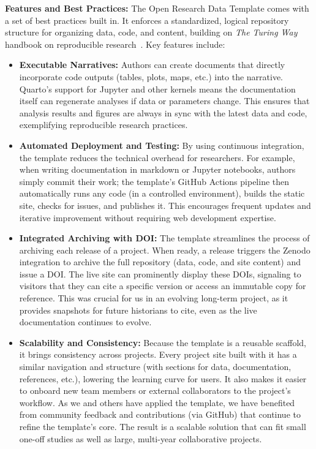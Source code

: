 \documentclass{anthology-ch}         %
\begin{document}
\textbf{Features and Best Practices:} The Open Research Data Template comes with a set of best practices built in. It enforces a standardized, logical repository structure for organizing data, code, and content, building on \emph{The Turing Way} handbook on reproducible research~\cite{theturingwaycommunity2025}. Key features include:

\begin{itemize}
\tightlist
\item
  \textbf{Executable Narratives:} Authors can create documents that directly incorporate code outputs (tables, plots, maps, etc.) into the narrative. Quarto's support for Jupyter and other kernels means the documentation itself can regenerate analyses if data or parameters change. This ensures that analysis results and figures are always in sync with the latest data and code, exemplifying reproducible research practices.\\
\item
  \textbf{Automated Deployment and Testing:} By using continuous integration, the template reduces the technical overhead for researchers. For example, when writing documentation in markdown or Jupyter notebooks, authors simply commit their work; the template's GitHub Actions pipeline then automatically runs any code (in a controlled environment), builds the static site, checks for issues, and publishes it. This encourages frequent updates and iterative improvement without requiring web development expertise.\\
\item
  \textbf{Integrated Archiving with DOI:} The template streamlines the process of archiving each release of a project. When ready, a release triggers the Zenodo integration to archive the full repository (data, code, and site content) and issue a DOI. The live site can prominently display these DOIs, signaling to visitors that they can cite a specific version or access an immutable copy for reference. This was crucial for us in an evolving long-term project, as it provides snapshots for future historians to cite, even as the live documentation continues to evolve.\\
\item
  \textbf{Scalability and Consistency:} Because the template is a reusable scaffold, it brings consistency across projects. Every project site built with it has a similar navigation and structure (with sections for data, documentation, references, etc.), lowering the learning curve for users. It also makes it easier to onboard new team members or external collaborators to the project's workflow. As we and others have applied the template, we have benefited from community feedback and contributions (via GitHub) that continue to refine the template's core. The result is a scalable solution that can fit small one-off studies as well as large, multi-year collaborative projects.
\end{itemize}
\end{document}
